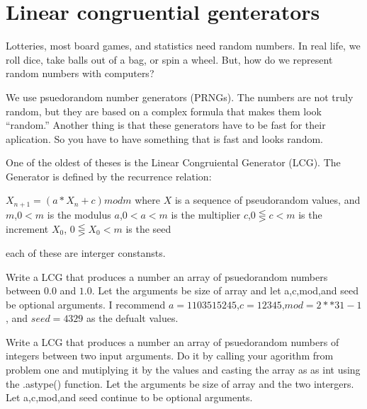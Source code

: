 \label{Ch:PRNG}


\section*{Linear congruential genterators}


Lotteries, most board games, and statistics need random numbers. In real life, we roll dice, take balls out of a bag, or spin a wheel. But, how do we represent random numbers with computers?

We use psuedorandom number generators (PRNGs). The numbers are not truly random, but they are based on a complex formula that makes them look ``random.'' Another thing is that these generators have to be fast for their aplication. So you have to have something that is fast and looks random.

One of the oldest of theses is the Linear Congruiental Generator (LCG). The Generator is defined by the recurrence relation:

$X_{n+1}=(a*X_n + c) mod m$
where $X$ is a sequence of pseudorandom values, and
$m$,$0<m$ is the modulus
$a$,$0<a<m$ is the multiplier
$c$,$0\lesseqgtr c<m$ is the increment
$X_0$, $0\lesseqgtr X_0 <m$ is the seed

each of these are interger constansts.



\begin{problem}
Write a LCG that produces a number an array of psuedorandom numbers between $0.0$ and $1.0$. Let the arguments be size of array and let a,c,mod,and seed be optional arguments. I recommend $a=1103515245$,$c=12345$,$mod=2**31-1$, and $seed=4329$ as the defualt values.
\end{problem}

\begin{problem}
Write a LCG that produces a number an array of psuedorandom numbers of integers between two input arguments. Do it by calling your agorithm from problem one and mutiplying it by the values and casting the array as as int using the .astype() function. Let the arguments be size of array and the two intergers. Let a,c,mod,and seed continue to be optional arguments.
\end{problem}

